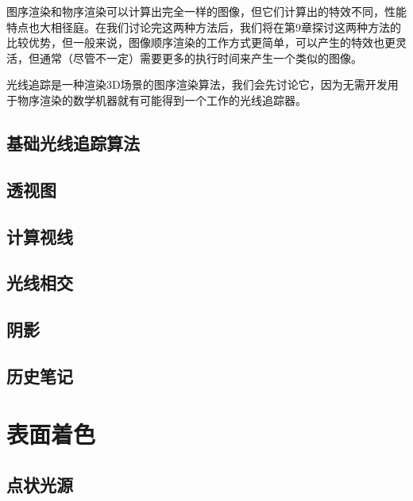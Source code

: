 \documentclass[lang=cn,12pt,marginpar=margintrue]{elegantbook}
\begin{document}
图序渲染和物序渲染可以计算出完全一样的图像，但它们计算出的特效不同，性能特点也大相径庭。在我们讨论完这两种方法后，我们将在第9章探讨这两种方法的比较优势，但一般来说，图像顺序渲染的工作方式更简单，可以产生的特效也更灵活，但通常（尽管不一定）需要更多的执行时间来产生一个类似的图像。


光线追踪是一种渲染3D场景的图序渲染算法，我们会先讨论它，因为无需开发用于物序渲染的数学机器就有可能得到一个工作的光线追踪器。

\section{基础光线追踪算法}



\section{透视图}

\section{计算视线}

\section{光线相交}

\section{阴影}

\section{历史笔记}

\chapter{表面着色}

\section{点状光源}
\end{document}

